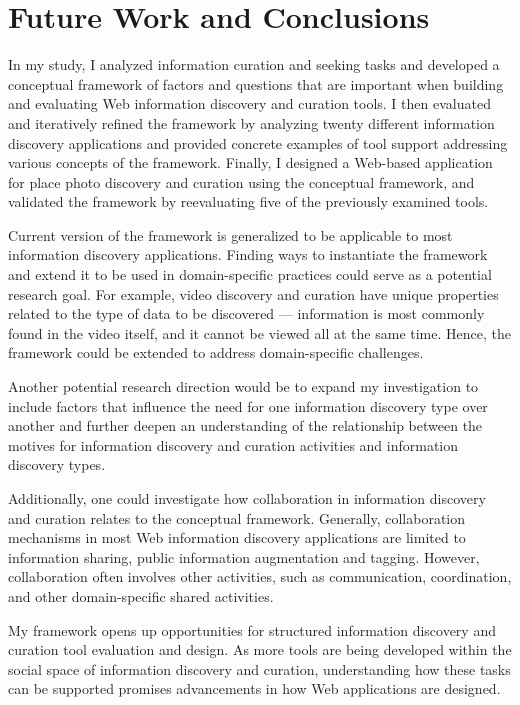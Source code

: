 \chapter{Future Work and Conclusions}
\label{chapter:future_work}


In my study, I analyzed information curation and seeking tasks and developed a conceptual framework of factors and questions that are important when building and evaluating Web information discovery and curation tools. I then evaluated and iteratively refined the framework by analyzing twenty different information discovery applications and provided concrete examples of tool support addressing various concepts of the framework. Finally, I designed a Web-based application for place photo discovery and curation using the conceptual framework, and validated the framework by reevaluating five of the previously examined tools.

Current version of the framework is generalized to be applicable to most information discovery applications. Finding ways to instantiate the framework and extend it to be used in domain-specific practices could serve as a potential research goal. For example, video discovery and curation have  unique properties related to the type of data to be discovered --- information is most commonly found in the video itself, and it cannot be viewed all at the same time. Hence, the framework could be extended to address domain-specific challenges. 

Another potential research direction would be to expand my investigation to include factors that influence the need for one information discovery type over another and further deepen an understanding of the relationship between the motives for information discovery and curation activities and information discovery types. 

Additionally, one could investigate how collaboration in information discovery and curation relates to the conceptual framework. Generally, collaboration mechanisms in most Web information discovery applications are limited to information sharing, public information augmentation and tagging. However, collaboration often involves other activities, such as communication, coordination, and other domain-specific shared activities.

My framework opens up opportunities for structured information discovery and curation tool evaluation and design. As more tools are being developed within the social space of information discovery and curation, understanding how these tasks can be supported promises advancements in how Web applications are designed.




